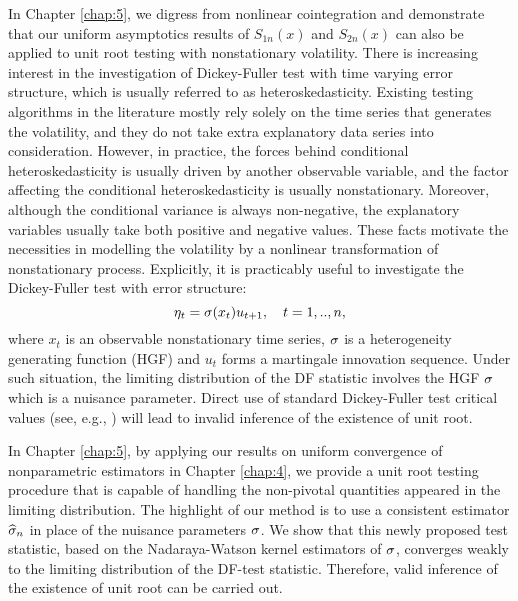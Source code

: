 In Chapter \ref{chap:5}, we digress from nonlinear cointegration and demonstrate that our uniform asymptotics results of $S_{1n}(x)$ and $S_{2n}(x)$ can also be applied to unit root testing with nonstationary volatility. There is increasing interest in the investigation of Dickey-Fuller test with time varying error structure, which is  usually referred to as heteroskedasticity. Existing testing algorithms in the literature mostly rely solely on the  time series that generates the volatility, and they do not  take extra explanatory data series into consideration. However, in practice, the forces behind conditional heteroskedasticity is usually driven by another observable variable, and the factor affecting the conditional heteroskedasticity is usually nonstationary. Moreover, although the conditional variance is always non-negative, the explanatory variables usually take both positive and negative values. These facts motivate the necessities in  modelling the volatility by a nonlinear transformation of nonstationary process. Explicitly, it is practicably useful to investigate  the Dickey-Fuller test with  error structure:
\begin{equation} \la{eqn11}
\eta_{t} = \si (x_{t}) u_{t+1}, \quad t = 1,.., n,
\end{equation}
where $x_{t}$ is an observable  nonstationary time series, $\sigma$ is  a heterogeneity generating function (HGF) and $u_{t}$ forms a martingale innovation sequence. Under such situation, the limiting distribution of the DF statistic involves the HGF $\sigma$  which is a nuisance parameter. Direct use of standard Dickey-Fuller test critical values (see, e.g., \cite{fuller1996}) will lead to invalid inference of the existence of unit root.

In Chapter \ref{chap:5}, by applying our results on uniform convergence of nonparametric estimators in Chapter \ref{chap:4}, we provide a unit root testing procedure that is capable of handling the non-pivotal quantities appeared in the limiting distribution. The highlight of our method is to use a consistent estimator $\widehat{\sigma}_n$ in place of the nuisance parameters $\sigma$. We show that this newly proposed test statistic, based on the Nadaraya-Watson kernel estimators of $\sigma$, converges weakly to the limiting distribution of the DF-test statistic. Therefore, valid inference of the existence of unit root can be carried out.

